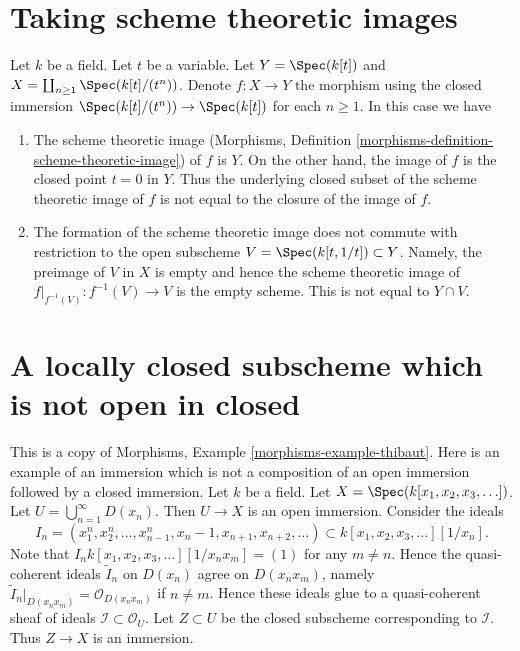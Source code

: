 \section{Taking scheme theoretic images}
\label{section-scheme-theoretic-image}

\noindent
Let $k$ be a field. Let $t$ be a variable. Let $Y = \Spec(k[t])$
and $X = \coprod_{n \geq 1} \Spec(k[t]/(t^n))$. Denote
$f : X \to Y$ the morphism
using the closed immersion $\Spec(k[t]/(t^n)) \to \Spec(k[t])$
for each $n \geq 1$. In this case we have
\begin{enumerate}
\item The scheme theoretic image
(Morphisms, Definition \ref{morphisms-definition-scheme-theoretic-image})
of $f$ is $Y$. On the other hand, the image of $f$ is the closed
point $t = 0$ in $Y$. Thus the underlying closed subset of the
scheme theoretic image of $f$
is not equal to the closure of the image of $f$.
\item The formation of the scheme theoretic image does not commute
with restriction to the open subscheme $V = \Spec(k[t, 1/t]) \subset Y$.
Namely, the preimage of $V$ in $X$ is empty and hence the scheme theoretic
image of $f|_{f^{-1}(V)} : f^{-1}(V) \to V$ is the empty scheme.
This is not equal to $Y \cap V$.
\end{enumerate}






\section{A locally closed subscheme which is not open in closed}
\label{section-strange-immersion}

\noindent
This is a copy of
Morphisms, Example \ref{morphisms-example-thibaut}.
Here is an example of an immersion which is not a composition of an
open immersion followed by a closed immersion.
Let $k$ be a field.
Let $X = \Spec(k[x_1, x_2, x_3, \ldots])$.
Let $U = \bigcup_{n = 1}^{\infty} D(x_n)$.
Then $U \to X$ is an open immersion.
Consider the ideals
$$
I_n =
(x_1^n, x_2^n, \ldots, x_{n - 1}^n, x_n - 1, x_{n + 1}, x_{n + 2}, \ldots)
\subset
k[x_1, x_2, x_3, \ldots][1/x_n].
$$
Note that $I_n k[x_1, x_2, x_3, \ldots][1/x_nx_m] = (1)$
for any $m \not = n$. Hence the quasi-coherent ideals
$\widetilde I_n$ on $D(x_n)$ agree on $D(x_nx_m)$, namely
$\widetilde I_n|_{D(x_nx_m)} = \mathcal{O}_{D(x_n x_m)}$ if
$n \not = m$. Hence these ideals glue to a quasi-coherent sheaf of ideals
$\mathcal{I} \subset \mathcal{O}_U$.
Let $Z \subset U$ be the closed subscheme corresponding to
$\mathcal{I}$. Thus $Z \to X$ is an immersion.

